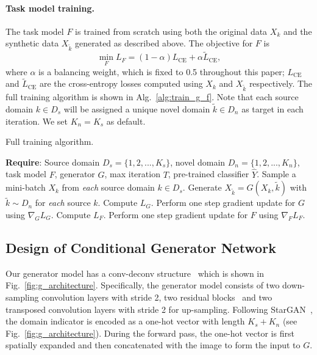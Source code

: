 \documentclass[runningheads]{llncs}
\begin{document}
\paragraph{Task model training.}
The task model $F$ is trained from scratch using both the original data $X_k$ and the synthetic data $X_{\tilde{k}}$ generated as described above. The objective for $F$ is
\begin{equation} \label{eq:obj_f}
\min_F L_F = (1 - \alpha) L_{\mathrm{CE}} + \alpha \tilde{L}_{\mathrm{CE}},
\end{equation}
where $\alpha$ is a balancing weight, which is fixed to 0.5 throughout this paper; $L_{\mathrm{CE}}$ and $\tilde{L}_{\mathrm{CE}}$ are the cross-entropy losses computed using $X_{k}$ and $X_{\tilde{k}}$ respectively. The full training algorithm is shown in Alg.~\ref{alg:train_g_f}. Note that each source domain $k \in D_s$ will be assigned a unique novel domain $\tilde{k} \in D_n$ as target in each iteration. We set $K_n = K_s$ as default.

\begin{algorithm}[t]
\caption{Full training algorithm.}
\label{alg:train_g_f}
\footnotesize
\begin{algorithmic}[1] \STATE \textbf{Require}: Source domain $D_s = \{ 1,2,...,K_s \}$, novel domain $D_n=\{ 1,2,...,K_n \}$, task model $F$, generator $G$, max iteration $T$, pre-trained classifier $\hat{Y}$.
    \STATE Sample a mini-batch $X_k$ from \emph{each} source domain $k \in D_s$.
    \STATE Generate $X_{\tilde{k}} = G(X_k, \tilde{k})$ with $\tilde{k} \sim D_n$ for \emph{each} source $k$.
    \STATE Compute $L_G$.
    \STATE Perform one step gradient update for $G$ using $\nabla_G L_G$.
    \STATE Compute $L_F$.
    \STATE Perform one step gradient update for $F$ using $\nabla_F L_F$.
    \ENDFOR
\end{algorithmic}
\end{algorithm}

\subsection{Design of Conditional Generator Network} \label{subsec:design_g}
Our generator model has a conv-deconv structure~\cite{CycleGAN,StarGAN} which is shown in Fig.~\ref{fig:g_architecture}. Specifically, the generator model consists of two down-sampling convolution layers with stride 2, two residual blocks~\cite{he2016deep} and two transposed convolution layers with stride 2 for up-sampling. Following StarGAN~\cite{StarGAN}, the domain indicator is encoded as a one-hot vector with length $K_s+K_n$ (see Fig.~\ref{fig:g_architecture}). During the forward pass, the one-hot vector is first spatially expanded and then concatenated with the image to form the input to $G$.
\end{document}
